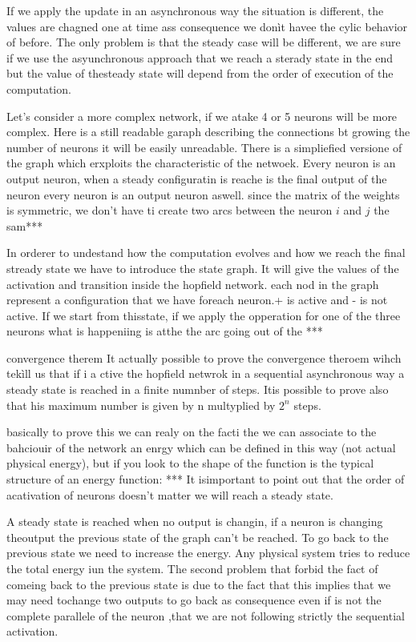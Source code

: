 \documentclass{article}
\begin{document}
If we apply the update in an asynchronous way the situation is different, the values are chagned one at time
ass consequence we donìt havee the cylic behavior of before. The only problem is that the steady case will
be different, we are sure if we use the asyunchronous approach that we reach a sterady state in the end but the value
of thesteady state will depend from the order of execution of the computation.

Let's consider a more complex network, if we atake 4 or 5 neurons will be more complex. Here is a still
readable garaph describing the connections bt growing the number of neurons it will be easily unreadable.
There is a simpliefied versione of the graph which erxploits the characteristic of the netwoek.
Every neuron is an output neuron, when a steady configuratin is reache is the final output of the neuron
every neuron is an output neuron aswell.
since the matrix of the weights is symmetric, we don't have ti create
two arcs between the neuron $i$ and $j$ the sam***

In orderer to undestand how the computation evolves and how we reach the final stready state we have
to introduce the state graph. It will give the values of the activation and
transition inside the hopfield network. each nod in the graph represent a configuration that we
have foreach neuron.+ is active and - is not active.
If we start from thisstate, if we apply the opperation for one of the three neurons what is happeniing
is atthe the arc going out of the ***


convergence therem
It actually possible to prove the convergence theroem wihch tekìll us that if i a ctive the hopfield netwrok
in a sequential asynchronous way a steady state is reached in a finite numnber of steps.
Itis possible to prove also that his maximum number is given by n multyplied by $2^n$ steps.

basically to prove this we can realy on the facti the we can associate to the bahciouir of the network
an enrgy which can be defined in this way (not actual physical energy), but if you look
to the shape of the function is the typical structure of an energy function:
***
It isimportant to point out that the order of acativation of neurons
doesn't matter we will reach a steady state.

A steady state is reached when no output is changin, if a neuron is changing theoutput the previous state of the graph can't
be reached. To go back to the previous state we need to increase the energy. Any physical system
tries to reduce the total energy iun the system. The second problem that forbid the fact of
comeing back to the previous state is due to the fact that this implies that we may need
tochange two outputs to go back as consequence even if is not the complete parallele of the
neuron ,that we are not following strictly the sequential activation.
\end{document}
